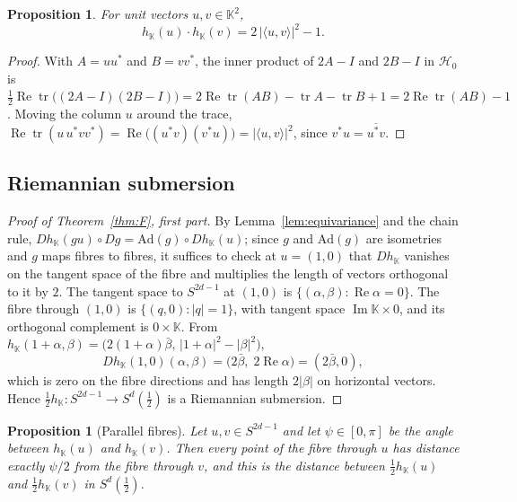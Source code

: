 \documentclass[11pt]{amsart}
\numberwithin{equation}{section}
\theoremstyle{plain}
\newtheorem{proposition}[theorem]{Proposition}
\theoremstyle{definition}
\theoremstyle{remark}
\newcommand{\K}{\mathbb{K}}
\newcommand{\Imag}{\operatorname{Im}}
\renewcommand{\Re}{\operatorname{Re}}
\begin{document}
\begin{proposition}\label{prop:dotproduct}
For unit vectors $u,v\in\K^2$,
\[
h_\K(u)\cdot h_\K(v)=2\,|\langle u,v\rangle|^2-1 .
\]
\end{proposition}

\begin{proof}
With $A=uu^*$ and $B=vv^*$, the inner product of $2A-I$ and $2B-I$ in $\mathcal H_0$ is $\tfrac12\Re\operatorname{tr}\bigl((2A-I)(2B-I)\bigr)=2\Re\operatorname{tr}(AB)-\operatorname{tr}A-\operatorname{tr}B+1=2\Re\operatorname{tr}(AB)-1$. Moving the column $u$ around the trace, $\Re\operatorname{tr}(u\,u^*vv^*)=\Re\bigl((u^*v)(v^*u)\bigr)=|\langle u,v\rangle|^2$, since $v^*u=\overline{u^*v}$.
\end{proof}

\subsection{Riemannian submersion}\label{sec:submersion}

\begin{proof}[Proof of Theorem~\ref{thm:F}, first part]
By Lemma~\ref{lem:equivariance} and the chain rule, $Dh_\K(gu)\circ Dg=\mathrm{Ad}(g)\circ Dh_\K(u)$; since $g$ and $\mathrm{Ad}(g)$ are isometries and $g$ maps fibres to fibres, it suffices to check at $u=(1,0)$ that $Dh_\K$ vanishes on the tangent space of the fibre and multiplies the length of vectors orthogonal to it by $2$. The tangent space to $S^{2d-1}$ at $(1,0)$ is $\{(\alpha,\beta):\Re\alpha=0\}$. The fibre through $(1,0)$ is $\{(q,0):|q|=1\}$, with tangent space $\Imag\K\times0$, and its orthogonal complement is $0\times\K$. From $h_\K(1+\alpha,\beta)=\bigl(2(1+\alpha)\bar\beta,\,|1+\alpha|^2-|\beta|^2\bigr)$,
\[
Dh_\K(1,0)(\alpha,\beta)=\bigl(2\bar\beta,\;2\Re\alpha\bigr)=(2\bar\beta,0),
\]
which is zero on the fibre directions and has length $2|\beta|$ on horizontal vectors. Hence $\tfrac12h_\K\colon S^{2d-1}\to S^d(\tfrac12)$ is a Riemannian submersion.
\end{proof}

\begin{proposition}[Parallel fibres]\label{prop:parallel}
Let $u,v\in S^{2d-1}$ and let $\psi\in[0,\pi]$ be the angle between $h_\K(u)$ and $h_\K(v)$. Then every point of the fibre through $u$ has distance exactly $\psi/2$ from the fibre through $v$, and this is the distance between $\tfrac12h_\K(u)$ and $\tfrac12h_\K(v)$ in $S^d(\tfrac12)$.
\end{proposition}
\end{document}
